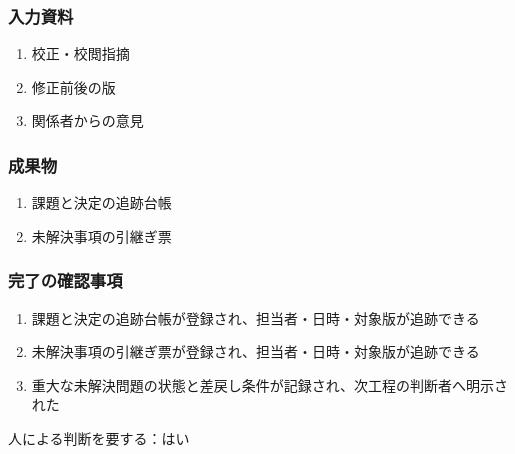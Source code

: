 \documentclass[a4paper,11pt]{article}
\begin{document}
\subsubsection*{入力資料}
\begin{enumerate}[leftmargin=2em,itemsep=0.35em]
\item 校正・校閲指摘
\item 修正前後の版
\item 関係者からの意見
\end{enumerate}
\subsubsection*{成果物}
\begin{enumerate}[leftmargin=2em,itemsep=0.35em]
\item 課題と決定の追跡台帳
\item 未解決事項の引継ぎ票
\end{enumerate}
\subsubsection*{完了の確認事項}
\begin{enumerate}[leftmargin=2em,itemsep=0.35em]
\item 課題と決定の追跡台帳が登録され、担当者・日時・対象版が追跡できる
\item 未解決事項の引継ぎ票が登録され、担当者・日時・対象版が追跡できる
\item 重大な未解決問題の状態と差戻し条件が記録され、次工程の判断者へ明示された
\end{enumerate}
\par 人による判断を要する：はい\par\medskip
\end{document}
